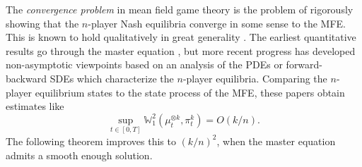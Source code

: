 \documentclass[11pt,reqno]{amsart}
\numberwithin{equation}{section}
\theoremstyle{definition}
\newcommand{\W}{\mathbb W}
\begin{document}
The \emph{convergence problem} in mean field game theory is the problem of rigorously showing that the $n$-player Nash equilibria converge in some sense to the MFE. This is known to hold qualitatively in great generality \cite{lacker2020convergence,djete2023large}. The earliest quantitative results go through the master equation \cite{MasterEquation}, but more recent progress has developed non-asymptotic viewpoints based on an analysis of the PDEs \cite{cirant2025priori,JacksonGAMES} or forward-backward SDEs \cite{jackson2024quantitative,possamai2025non} which characterize the $n$-player equilibria. 
Comparing the $n$-player equilibrium states to the state process of the MFE, these papers obtain estimates like
\begin{equation}
\sup_{t \in [0,T]}\W^2_1(\mu^{\otimes k}_t,\pi^k_t)=O(k/n). \label{MFGpriorbounds}
\end{equation}
The following theorem improves this to $(k/n)^2$, when the master equation admits a smooth enough solution.
\end{document}
